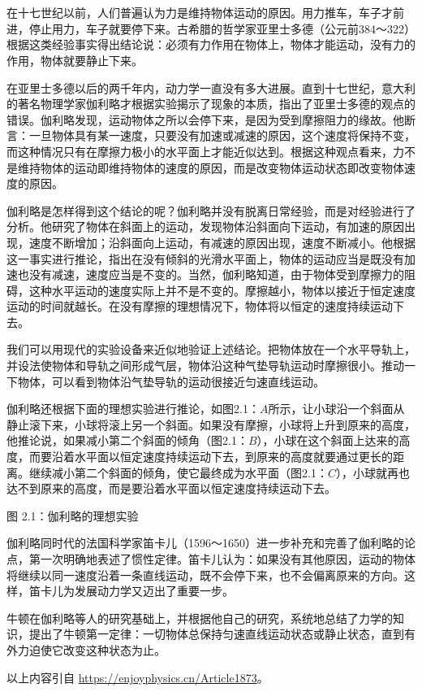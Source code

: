 \chapter[质点运动学与动力学]{}
\begin{prove}
    在十七世纪以前，人们普遍认为力是维持物体运动的原因。用力推车，车子才前进，停止用力，车子就要停下来。古希腊的哲学家亚里士多德（公元前384～322）根据这类经验事实得出结论说：必须有力作用在物体上，物体才能运动，没有力的作用，物体就要静止下来。

    在亚里士多德以后的两千年内，动力学一直没有多大进展。直到十七世纪，意大利的著名物理学家伽利略才根据实验揭示了现象的本质，指出了亚里士多德的观点的错误。伽利略发现，运动物体之所以会停下来，是因为受到摩擦阻力的缘故。他断言：一旦物体具有某一速度，只要没有加速或减速的原因，这个速度将保持不变，而这种情况只有在摩擦力极小的水平面上才能近似达到。根据这种观点看来，力不是维持物体的运动即维持物体的速度的原因，而是改变物体运动状态即改变物体速度的原因。

    伽利略是怎样得到这个结论的呢？伽利略并没有脱离日常经验，而是对经验进行了分析。他研究了物体在斜面上的运动，发现物体沿斜面向下运动，有加速的原因出现，速度不断增加；沿斜面向上运动，有减速的原因出现，速度不断减小。他根据这一事实进行推论，指出在没有倾斜的光滑水平面上，物体的运动应当是既没有加速也没有减速，速度应当是不变的。当然，伽利略知道，由于物体受到摩擦力的阻碍，这种水平运动的速度实际上并不是不变的。摩擦越小，物体以接近于恒定速度运动的时间就越长。在没有摩擦的理想情况下，物体将以恒定的速度持续运动下去。

    我们可以用现代的实验设备来近似地验证上述结论。把物体放在一个水平导轨上，并设法使物体和导轨之间形成气层，物体沿这种气垫导轨运动时摩擦很小。推动一下物体，可以看到物体沿气垫导轨的运动很接近匀速直线运动。

    伽利略还根据下面的理想实验进行推论，如图2.1：$A$所示，让小球沿一个斜面从静止滚下来，小球将滚上另一个斜面。如果没有摩擦，小球将上升到原来的高度，他推论说，如果减小第二个斜面的倾角（图2.1：$B$），小球在这个斜面上达来的高度，而要沿着水平面以恒定速度持续运动下去，到原来的高度就要通过更长的距离。继续减小第二个斜面的倾角，使它最终成为水平面（图2.1：$C$），小球就再也达不到原来的高度，而是要沿着水平面以恒定速度持续运动下去。

    \begin{center}
        图 2.1：伽利略的理想实验
    \end{center}
    伽利略同时代的法国科学家笛卡儿（1596～1650）进一步补充和完善了伽利略的论点，第一次明确地表述了惯性定律。笛卡儿认为：如果没有其他原因，运动的物体将继续以同一速度沿着一条直线运动，既不会停下来，也不会偏离原来的方向。这样，笛卡儿为发展动力学又迈出了重要一步。

    牛顿在伽利略等人的研究基础上，并根据他自己的研究，系统地总结了力学的知识，提出了牛顿第一定律：一切物体总保持匀速直线运动状态或静止状态，直到有外力迫使它改变这种状态为止。

    以上内容引自 \url{https://enjoyphysics.cn/Article1873}。
\end{prove}

